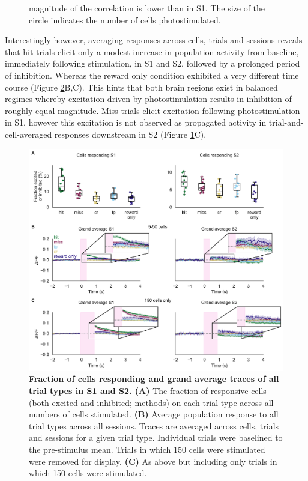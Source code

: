 \begin{figure}[htbp]
{magnitude of the correlation is lower than in S1. The size of the circle indicates the number of cells photostimulated. 
} 
\label{fig:basic-analysis}
\end{figure}

Interestingly however, averaging responses across cells, trials and sessions reveals that hit trials elicit only a modest increase in population activity from baseline, immediately following stimulation, in S1 and S2, followed by a prolonged period of inhibition. Whereas the reward only condition exhibited a very different time course (Figure \ref{fig:supp1}B,C). This hints that both brain regions exist in balanced regimes whereby excitation driven by photostimulation results in inhibition of roughly equal magnitude. Miss trials elicit excitation following photostimulation in S1, however this excitation is not observed as propagated activity in trial-and-cell-averaged responses downstream in S2 (Figure \ref{fig:basic-analysis}C). 


\begin{figure}[h]
\hspace*{-0.25in}
\includegraphics[scale=0.65]{figures/supplements/Supplementary_Figure1.pdf}
\caption[\textbf{Fraction of cells responding and grand average traces of all trial types in S1 and S2}]{\textbf{ Fraction of cells responding and grand average traces of all trial types in S1 and S2.
 (A)} The fraction of responsive cells (both excited and inhibited; methods) on each trial type across all numbers of cells stimulated. \textbf{(B)} Average population response to all trial types across all sessions. Traces are averaged across cells, trials and sessions for a given trial type. Individual trials were baselined to the pre-stimulus mean. Trials in which 150 cells were stimulated were removed for display. \textbf{(C)} As above but including only trials in which 150 cells were stimulated. 
} 
\label{fig:supp1}
\end{figure}


